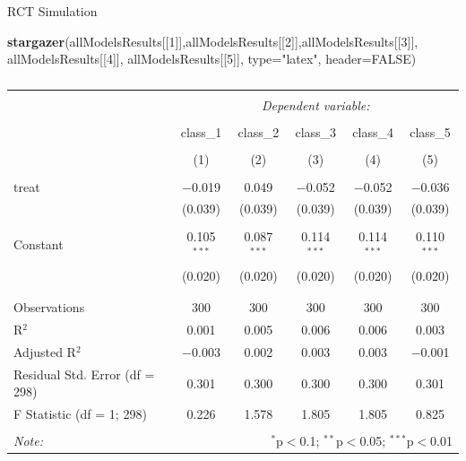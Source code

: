 \documentclass[
  ignorenonframetext,
]{beamer}
\newenvironment{Shaded}{\begin{snugshade}}{\end{snugshade}}
\newcommand{\DataTypeTok}[1]{\textcolor[rgb]{0.13,0.29,0.53}{#1}}
\newcommand{\DecValTok}[1]{\textcolor[rgb]{0.00,0.00,0.81}{#1}}
\newcommand{\KeywordTok}[1]{\textcolor[rgb]{0.13,0.29,0.53}{\textbf{#1}}}
\newcommand{\NormalTok}[1]{#1}
\newcommand{\OtherTok}[1]{\textcolor[rgb]{0.56,0.35,0.01}{#1}}
\newcommand{\StringTok}[1]{\textcolor[rgb]{0.31,0.60,0.02}{#1}}
\begin{document}
\begin{frame}[fragile]{RCT Simulation}
\protect\hypertarget{rct-simulation-7}{}
\tiny

\begin{Shaded}
\begin{Highlighting}[]
\KeywordTok{stargazer}\NormalTok{(allModelsResults[[}\DecValTok{1}\NormalTok{]],allModelsResults[[}\DecValTok{2}\NormalTok{]],allModelsResults[[}\DecValTok{3}\NormalTok{]],}
\NormalTok{          allModelsResults[[}\DecValTok{4}\NormalTok{]], allModelsResults[[}\DecValTok{5}\NormalTok{]], }\DataTypeTok{type=}\StringTok{"latex"}\NormalTok{, }\DataTypeTok{header=}\OtherTok{FALSE}\NormalTok{)}
\end{Highlighting}
\end{Shaded}

\begin{table}[!htbp] \centering 
  \caption{} 
  \label{} 
\begin{tabular}{@{\extracolsep{5pt}}lccccc} 
\\[-1.8ex]\hline 
\hline \\[-1.8ex] 
 & \multicolumn{5}{c}{\textit{Dependent variable:}} \\ 
\cline{2-6} 
\\[-1.8ex] & class\_1 & class\_2 & class\_3 & class\_4 & class\_5 \\ 
\\[-1.8ex] & (1) & (2) & (3) & (4) & (5)\\ 
\hline \\[-1.8ex] 
 treat & $-$0.019 & 0.049 & $-$0.052 & $-$0.052 & $-$0.036 \\ 
  & (0.039) & (0.039) & (0.039) & (0.039) & (0.039) \\ 
  & & & & & \\ 
 Constant & 0.105$^{***}$ & 0.087$^{***}$ & 0.114$^{***}$ & 0.114$^{***}$ & 0.110$^{***}$ \\ 
  & (0.020) & (0.020) & (0.020) & (0.020) & (0.020) \\ 
  & & & & & \\ 
\hline \\[-1.8ex] 
Observations & 300 & 300 & 300 & 300 & 300 \\ 
R$^{2}$ & 0.001 & 0.005 & 0.006 & 0.006 & 0.003 \\ 
Adjusted R$^{2}$ & $-$0.003 & 0.002 & 0.003 & 0.003 & $-$0.001 \\ 
Residual Std. Error (df = 298) & 0.301 & 0.300 & 0.300 & 0.300 & 0.301 \\ 
F Statistic (df = 1; 298) & 0.226 & 1.578 & 1.805 & 1.805 & 0.825 \\ 
\hline 
\hline \\[-1.8ex] 
\textit{Note:}  & \multicolumn{5}{r}{$^{*}$p$<$0.1; $^{**}$p$<$0.05; $^{***}$p$<$0.01} \\ 
\end{tabular} 
\end{table}
\end{frame}
\end{document}
